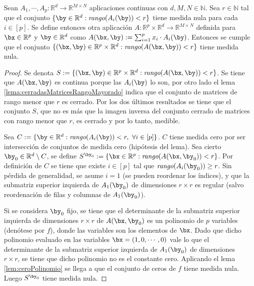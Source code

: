 \begin{lema} \label{lema:aux2}
Sean $A_1,\cdots ,A_p:\mathbb{R}^d \rightarrow \mathbb{R}^{M\times N}$ aplicaciones continuas con $d,M,N\in\mathbb{N}$. Sea $r\in\mathbb{N}$ tal que el conjunto $\{\by\in\mathbb{R}^d : \textit{rango}(A_i(\by)) < r\}$ tiene medida nula para cada $i\in[p]$. Se define entonces otra aplicación $A:\mathbb{R}^p \times \mathbb{R}^d\rightarrow \mathbb{R}^{M\times N}$ definida para $\bx\in\mathbb{R}^p$ y $\by\in\mathbb{R}^d$ como $A(\bx,\by) := \sum_{i=1}^{p}x_i \cdot A_i(\by)$. Entonces se cumple que el conjunto $\{(\bx,\by)\in\mathbb{R}^p \times \mathbb{R}^d : \textit{rango}(A(\bx,\by)) < r\}$ tiene medida nula.
\end{lema}
\begin{proof}
Se denota $S:=\{(\bx,\by)\in\mathbb{R}^p \times \mathbb{R}^d : \textit{rango}(A(\bx,\by)) < r\}$. Se tiene que $A(\bx,\by)$ es continua porque las $A_i(\by)$ lo son, por otro lado el lema \ref{lema:cerradasMatricesRangoMayorado} indica que el conjunto de matrices de rango menor que $r$ es cerrado. Por los dos últimos resultados se tiene que el conjunto $S$, que no es más que la imagen inversa del conjunto cerrado de matrices con rango menor que $r$, es cerrado y por lo tanto, medible. 

Sea $C:=\{\by\in\mathbb{R}^d: \textit{rango}(A_i(\by)) < r, \ \forall i\in [p]\}$. $C$ tiene medida cero por ser intersección de conjuntos de medida cero (hipótesis del lema). Sea cierto $\by_0\in\mathbb{R}^d \setminus C$, se define $S^{\by_0}:=\{\bx\in\mathbb{R}^p:  \textit{rango}(A(\bx,\by_0))<r\}$. Por definición de $C$ se tiene que existe $i\in [p]$ tal que $\textit{rango}(A_i(\by_0)) \geq r$. Sin pérdida de generalidad, se asume $i=1$ (se pueden reordenar los índices), y que la submatriz superior izquierda de $A_1(\by_0)$ de dimensiones $r\times r$ es regular (salvo reordenación de filas y columnas de $A_1(\by_0)$).

Si se considera $\by_0$ fijo, se tiene que el determinante de la submatriz superior izquierda de dimensiones $r \times r$ de $A(\bx,\by_0)$ es un polinomio de $p$ variables (denótese por $f$), donde las variables son los elementos de $\bx$. Dado que dicho polinomio evaluado en las variables $\bx = (1,0,\cdots ,0)$ vale lo que el determinante  de la submatriz superior izquierda de $A_1(\by_0)$ de dimensiones $r\times r$, se tiene que dicho polinomio no es el constante cero. Aplicando el lema \ref{lem:ceroPolinomio} se llega a que el conjunto de ceros de $f$ tiene medida nula. Luego $S^{\by_0}$ tiene medida nula.


\end{proof}
